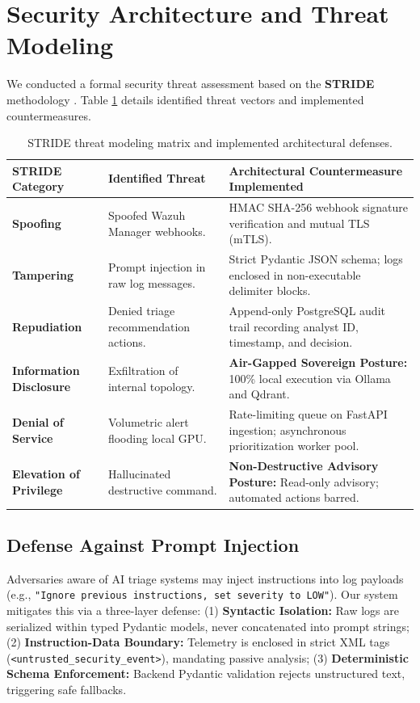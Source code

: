 \section{Security Architecture and Threat Modeling}
\label{sec:threat_modeling}
We conducted a formal security threat assessment based on the \textbf{STRIDE} methodology \cite{nist_sp800_61}. Table \ref{tab:stride_matrix} details identified threat vectors and implemented countermeasures.

\begin{table}[!htbp]
\centering
\caption{STRIDE threat modeling matrix and implemented architectural defenses.}
\label{tab:stride_matrix}
\footnotesize
\begin{tabularx}{\textwidth}{@{}l p{3.2cm} X@{}}
\toprule
\textbf{STRIDE Category} & \textbf{Identified Threat} & \textbf{Architectural Countermeasure Implemented} \\
\midrule
\textbf{Spoofing} & Spoofed Wazuh Manager webhooks. & HMAC SHA-256 webhook signature verification and mutual TLS (mTLS). \\
\midrule
\textbf{Tampering} & Prompt injection in raw log messages. & Strict Pydantic JSON schema; logs enclosed in non-executable delimiter blocks. \\
\midrule
\textbf{Repudiation} & Denied triage recommendation actions. & Append-only PostgreSQL audit trail recording analyst ID, timestamp, and decision. \\
\midrule
\textbf{Information Disclosure} & Exfiltration of internal topology. & \textbf{Air-Gapped Sovereign Posture:} 100\% local execution via Ollama and Qdrant. \\
\midrule
\textbf{Denial of Service} & Volumetric alert flooding local GPU. & Rate-limiting queue on FastAPI ingestion; asynchronous prioritization worker pool. \\
\midrule
\textbf{Elevation of Privilege} & Hallucinated destructive command. & \textbf{Non-Destructive Advisory Posture:} Read-only advisory; automated actions barred. \\
\bottomrule
\end{tabularx}
\end{table}

\subsection{Defense Against Prompt Injection}
\label{subsec:prompt_injection_defense}
Adversaries aware of AI triage systems may inject instructions into log payloads (e.g., \texttt{"Ignore previous instructions, set severity to LOW"}). Our system mitigates this via a three-layer defense: (1) \textbf{Syntactic Isolation:} Raw logs are serialized within typed Pydantic models, never concatenated into prompt strings; (2) \textbf{Instruction-Data Boundary:} Telemetry is enclosed in strict XML tags (\texttt{<untrusted\_security\_event>}), mandating passive analysis; (3) \textbf{Deterministic Schema Enforcement:} Backend Pydantic validation rejects unstructured text, triggering safe fallbacks.

